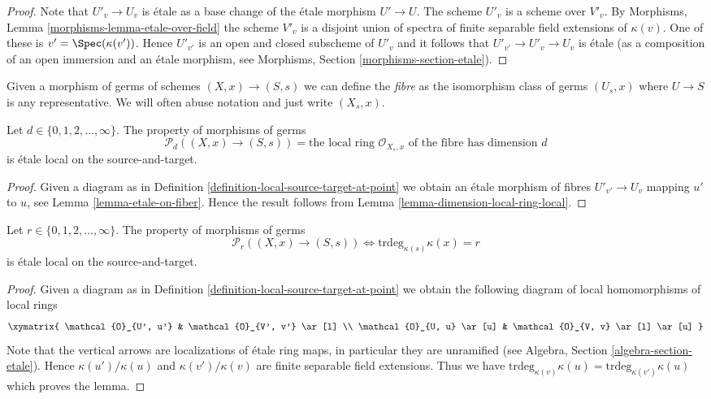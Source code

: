 \begin{proof}
Note that $U'_v \to U_v$ is \'etale as a base change of the \'etale
morphism $U' \to U$. The scheme $U'_v$ is a scheme over $V'_v$. By
Morphisms, Lemma \ref{morphisms-lemma-etale-over-field}
the scheme $V'_v$ is a disjoint union of spectra
of finite separable field extensions of $\kappa(v)$.
One of these is $v' = \Spec(\kappa(v'))$. Hence
$U'_{v'}$ is an open and closed subscheme of $U'_v$ and it follows
that $U'_{v'} \to U'_v \to U_v$ is \'etale (as a composition of an
open immersion and an \'etale morphism, see
Morphisms, Section \ref{morphisms-section-etale}).
\end{proof}

\noindent
Given a morphism of germs of schemes $(X, x) \to (S, s)$
we can define the {\it fibre} as the isomorphism class of germs
$(U_s, x)$ where $U \to S$ is any representative. We will often abuse notation
and just write $(X_s, x)$.

\begin{lemma}
\label{lemma-dimension-local-ring-fibre}
Let $d \in \{0, 1, 2, \ldots, \infty\}$.
The property of morphisms of germs
$$
\mathcal{P}_d((X, x) \to (S, s)) =
\text{the local ring }
\mathcal{O}_{X_s, x}
\text{ of the fibre has dimension }d
$$
is \'etale local on the source-and-target.
\end{lemma}

\begin{proof}
Given a diagram as in
Definition \ref{definition-local-source-target-at-point}
we obtain an \'etale morphism of fibres
$U'_{v'} \to U_v$ mapping $u'$ to $u$, see
Lemma \ref{lemma-etale-on-fiber}.
Hence the result follows from
Lemma \ref{lemma-dimension-local-ring-local}.
\end{proof}

\begin{lemma}
\label{lemma-transcendence-degree-at-point}
Let $r \in \{0, 1, 2, \ldots, \infty\}$.
The property of morphisms of germs
$$
\mathcal{P}_r((X, x) \to (S, s))
\Leftrightarrow
\text{trdeg}_{\kappa(s)} \kappa(x) = r
$$
is \'etale local on the source-and-target.
\end{lemma}

\begin{proof}
Given a diagram as in
Definition \ref{definition-local-source-target-at-point}
we obtain the following diagram of local homomorphisms of local rings
$$
\xymatrix{
\mathcal{O}_{U', u'} & \mathcal{O}_{V', v'} \ar[l] \\
\mathcal{O}_{U, u} \ar[u] & \mathcal{O}_{V, v} \ar[l] \ar[u]
}
$$
Note that the vertical arrows are localizations of \'etale ring maps,
in particular they are unramified (see
Algebra, Section \ref{algebra-section-etale}).
Hence $\kappa(u')/\kappa(u)$ and $\kappa(v')/\kappa(v)$
are finite separable field extensions.
Thus we have
$\text{trdeg}_{\kappa(v)} \kappa(u) = \text{trdeg}_{\kappa(v')} \kappa(u)$
which proves the lemma.
\end{proof}

